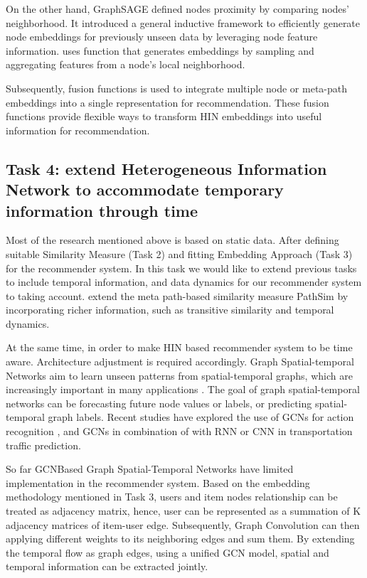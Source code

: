 \documentclass[12pt,a4 paper,title page]{article}
\theoremstyle{definition}
\begin{document}
On the other hand, GraphSAGE defined nodes proximity by comparing nodes' neighborhood. It introduced a general inductive framework to efficiently generate node embeddings for previously unseen data by leveraging node feature information. \citet{hamilton2017inductive} uses function that generates embeddings by sampling and aggregating features from a node’s local neighborhood.

Subsequently, fusion functions is used to integrate multiple node or meta-path embeddings into a single representation for recommendation. These fusion functions provide flexible ways to transform HIN embeddings into useful information for recommendation.


\subsection{Task 4: extend Heterogeneous Information Network to accommodate temporary information through time}

Most of the research mentioned above is based on static data. After defining suitable Similarity Measure (Task 2) and fitting Embedding Approach (Task 3) for the recommender system. In this task we would like to extend previous tasks to include temporal information, and data dynamics for our recommender system to taking account. \citet{he2014exploiting} extend the meta
path-based similarity measure PathSim by incorporating richer information, such as
transitive similarity and temporal dynamics. 

At the same time, in order to make HIN based recommender system to be time aware. Architecture adjustment is required accordingly. Graph Spatial-temporal Networks aim to learn unseen patterns from spatial-temporal graphs, which are increasingly important in many applications \citep{wu2019comprehensive}. 
The goal of graph spatial-temporal networks can be forecasting future node values or labels, or predicting spatial-temporal graph labels. Recent studies have explored the use of GCNs for action recognition \citep{yan2018spatial}, and GCNs in combination of with RNN \citep{li2017diffusion} or CNN \citep{yu2017spatio} in transportation traffic prediction.

So far GCNBased Graph Spatial-Temporal Networks have limited implementation in the recommender system. Based on the embedding methodology mentioned in Task 3, users and item nodes relationship can be treated as adjacency matrix, hence, user can be represented as a summation of K adjacency matrices of item-user edge. Subsequently, Graph Convolution can then applying different weights to its neighboring edges and sum them. By extending the temporal flow as graph edges, using a unified GCN model, spatial and temporal information can be extracted jointly.
\end{document}
